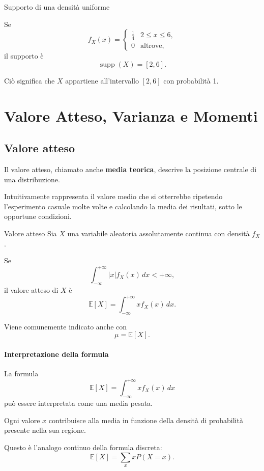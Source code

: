 \begin{example}{Supporto di una densità uniforme}

Se
\[
f_X(x)=
\begin{cases}
\frac14 & 2\leq x\leq6,\\
0 & \text{altrove},
\end{cases}
\]
il supporto è
\[
\operatorname{supp}(X)=[2,6].
\]

Ciò significa che $X$ appartiene
all'intervallo $[2,6]$ con probabilità 1.
\end{example}


\section{Valore Atteso, Varianza e Momenti}

\subsection{Valore atteso}

Il valore atteso, chiamato anche
\textbf{media teorica}, descrive
la posizione centrale di una distribuzione.

Intuitivamente rappresenta
il valore medio che si otterrebbe
ripetendo l'esperimento casuale
molte volte e calcolando
la media dei risultati, sotto
le opportune condizioni.

\begin{definition}{Valore atteso}
Sia $X$ una variabile aleatoria
assolutamente continua con densità $f_X$.

Se
\[
\int_{-\infty}^{+\infty}
|x|f_X(x)\,dx<+\infty,
\]
il valore atteso di $X$ è
\[
\boxed{
\mathbb{E}[X]
=
\int_{-\infty}^{+\infty}
x f_X(x)\,dx.
}
\]

Viene comunemente indicato anche con
\[
\mu=\mathbb{E}[X].
\]
\end{definition}

\paragraph{Interpretazione della formula}

La formula
\[
\mathbb{E}[X]
=
\int_{-\infty}^{+\infty}
x f_X(x)\,dx
\]
può essere interpretata come
una media pesata.

Ogni valore $x$ contribuisce alla media
in funzione della densità di probabilità
presente nella sua regione.

Questo è l'analogo continuo
della formula discreta:
\[
\mathbb{E}[X]
=
\sum_x xP(X=x).
\]

